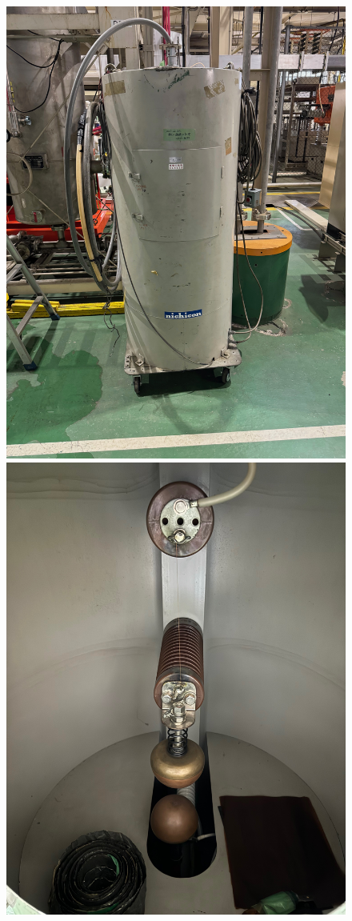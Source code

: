 \documentclass[book,openany]{jlreq}
\theoremstyle{definition}
\begin{document}
\begin{figure}[htbp]
  \centering
  \begin{minipage}[b]{0.45\linewidth}
    \centering
    \includegraphics[width=0.9\columnwidth]{./figs/Tanraku1.jpeg}
  \end{minipage}
  \begin{minipage}[b]{0.45\linewidth}
    \centering
    \includegraphics[width=0.9\columnwidth]{./figs/Tanraku2.jpeg}

\end{minipage}
\end{figure}
\end{document}
